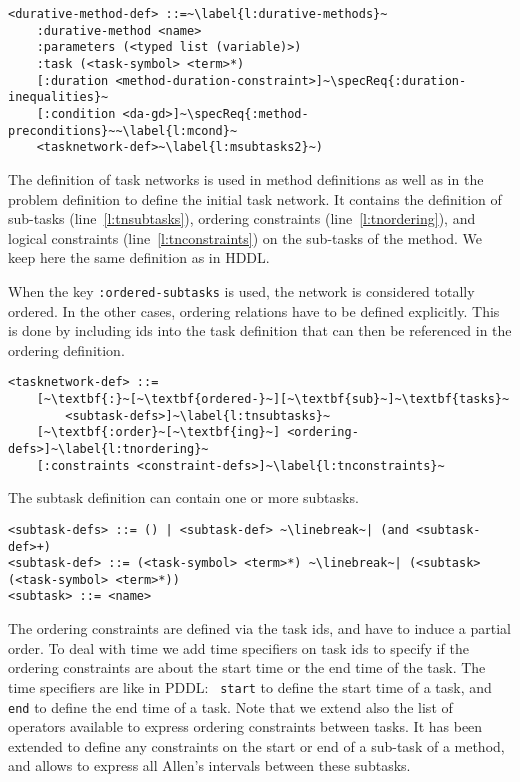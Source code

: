 \documentclass{article}
\begin{document}
\begin{lstlisting}[firstnumber=last, escapechar=~]
<durative-method-def> ::=~\label{l:durative-methods}~
    :durative-method <name>
    :parameters (<typed list (variable)>)
    :task (<task-symbol> <term>*)
    [:duration <method-duration-constraint>]~\specReq{:duration-inequalities}~
    [:condition <da-gd>]~\specReq{:method-preconditions}~~\label{l:mcond}~
    <tasknetwork-def>~\label{l:msubtasks2}~)
\end{lstlisting}

%
%
The definition of task networks is used in method definitions as well as in the problem definition to define the initial task network. It contains the definition of sub-tasks (line~\ref{l:tnsubtasks}), ordering constraints (line~\ref{l:tnordering}), and logical constraints (line~\ref{l:tnconstraints}) on the sub-tasks of the method. We keep here the same definition as in HDDL.

When the key \verb+:ordered-subtasks+ is used, the network is considered totally ordered. In the other cases, ordering relations have to be defined explicitly. This is done by including ids into the task definition that can then be referenced in the ordering definition. 

\begin{lstlisting}[firstnumber=last, escapechar=~]
<tasknetwork-def> ::=
    [~\textbf{:}~[~\textbf{ordered-}~][~\textbf{sub}~]~\textbf{tasks}~
        <subtask-defs>]~\label{l:tnsubtasks}~
    [~\textbf{:order}~[~\textbf{ing}~] <ordering-defs>]~\label{l:tnordering}~
    [:constraints <constraint-defs>]~\label{l:tnconstraints}~
\end{lstlisting}

%
%
\noindent The subtask definition can contain one or more subtasks. 

\begin{lstlisting}[firstnumber=last, escapechar=~]
<subtask-defs> ::= () | <subtask-def> ~\linebreak~| (and <subtask-def>+)
<subtask-def> ::= (<task-symbol> <term>*) ~\linebreak~| (<subtask> (<task-symbol> <term>*))
<subtask> ::= <name>
\end{lstlisting}

%
%
The ordering constraints are defined via the task ids, and have to induce a partial order. To deal with time we add time specifiers on task ids to specify if the ordering constraints are about the start time or the end time of the task. The time specifiers are like in PDDL: ~{\tt start} to define the start time of a task, and {\tt end}  to define the end time of a task. Note that we extend also the list of operators available to express ordering constraints between tasks. It has been extended to define any constraints on the start or end of a sub-task of a method, and allows to express all Allen's intervals \citep{allen1981interval} between these subtasks.
\end{document}
